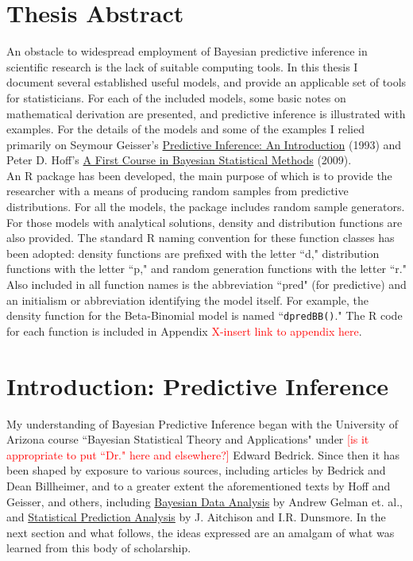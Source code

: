 \documentclass[12pt, a4paper]{article}
\begin{document}




\tableofcontents
\newpage


\section{Thesis Abstract}

An obstacle to widespread employment of Bayesian predictive inference in scientific research is the lack of suitable computing tools.  In this thesis I document several established useful models, and provide an applicable set of tools for statisticians.  For each of the included models, some basic notes on mathematical derivation are presented, and predictive inference is illustrated with examples.  For the details of the models and some of the examples I relied primarily on Seymour Geisser's \underline{Predictive Inference:  An Introduction} (1993) and Peter D. Hoff's \underline{A First Course in Bayesian Statistical Methods} (2009).\\

\noindent An R package has been developed, the main purpose of which is to provide the researcher with a means of producing random samples from predictive distributions.  For all the models, the package includes random sample generators.  For those models with analytical solutions, density and distribution functions are also provided.  The standard R naming convention for these function classes has been adopted:  density functions are prefixed with the letter ``d," distribution functions with the letter ``p," and random generation functions with the letter ``r."  Also included in all function names is the abbreviation ``pred" (for predictive) and an initialism or abbreviation identifying the model itself.  For example, the density function for the Beta-Binomial model is named ``\texttt{dpredBB()}."  The R code for each function is included in Appendix \textcolor{red}{X-insert link to appendix here}.




\section{Introduction:  Predictive Inference}

My understanding of Bayesian Predictive Inference began with the University of Arizona course ``Bayesian Statistical Theory and Applications" under \textcolor{red}{[is it appropriate to put ``Dr." here and elsewhere?]} Edward Bedrick.  Since then it has been shaped by exposure to various sources, including articles by Bedrick and Dean Billheimer, and to a greater extent the aforementioned texts by Hoff and Geisser, and others, including \underline{Bayesian Data Analysis} by Andrew Gelman et. al., and \underline{Statistical Prediction Analysis} by J. Aitchison and I.R. Dunsmore.  In the next section and what follows, the ideas expressed are an amalgam of what was learned from this body of scholarship.
\end{document}

